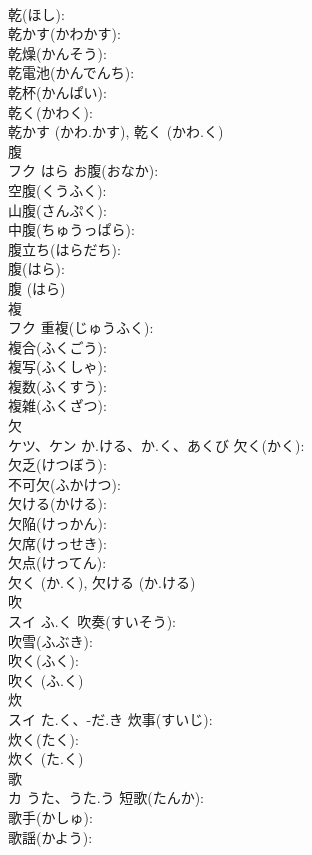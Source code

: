 \documentclass[8pt]{extreport}
\begin{document}
\begin{CJK}{UTF8}{min}
\\	乾(ほし): 
\\	乾かす(かわかす): 
\\	乾燥(かんそう): 
\\	乾電池(かんでんち): 
\\	乾杯(かんぱい): 
\\	乾く(かわく): 
\\	乾かす (かわ.かす), 乾く (かわ.く)
\\	腹			
\\	フク	はら	お腹(おなか): 
\\	空腹(くうふく): 
\\	山腹(さんぷく): 
\\	中腹(ちゅうっぱら): 
\\	腹立ち(はらだち): 
\\	腹(はら): 
\\	腹 (はら)
\\	複			
\\	フク		重複(じゅうふく): 
\\	複合(ふくごう): 
\\	複写(ふくしゃ): 
\\	複数(ふくすう): 
\\	複雑(ふくざつ): 
\\	欠		
\\	ケツ、ケン	か.ける、か.く、あくび	欠く(かく): 
\\	欠乏(けつぼう): 
\\	不可欠(ふかけつ): 
\\	欠ける(かける): 
\\	欠陥(けっかん): 
\\	欠席(けっせき): 
\\	欠点(けってん): 
\\	欠く (か.く), 欠ける (か.ける)
\\	吹		
\\	スイ	ふ.く	吹奏(すいそう): 
\\	吹雪(ふぶき): 
\\	吹く(ふく): 
\\	吹く (ふ.く)
\\	炊		
\\	スイ	た.く、-だ.き	炊事(すいじ): 
\\	炊く(たく): 
\\	炊く (た.く)
\\	歌		
\\	カ	うた、うた.う	短歌(たんか): 
\\	歌手(かしゅ): 
\\	歌謡(かよう): 

\end{CJK}
\end{document}
